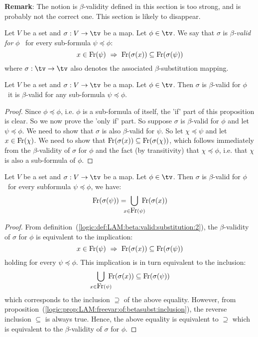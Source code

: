 {\bf Remark}: The notion is $\beta$-validity defined in this section
is too strong, and is probably not the correct one. This section is likely
to disappear.
\begin{defin}\label{logic:def:LAM:beta:valid:substitution:2}
    Let $V$ be a set and $\sigma:V\to\tv$ be a map. Let
    $\phi\in\tv$. We say that $\sigma$ is {\em $\beta$-valid for} $\phi$ 
    \ifand\ for every sub-formula $\psi\preceq\phi$:
    \[
        x\in\free(\psi)\ 
            \Rightarrow\ 
        \free(\sigma(x))\subseteq\free(\sigma(\psi))
    \]
    where $\sigma:\tv\to\tv$ also denotes the associated $\beta$-substitution 
    mapping.
\end{defin}

\begin{prop}\label{logic:prop:LAM:beta:valid:subformula}
    Let $V$ be a set and $\sigma:V\to\tv$ be a map. Let $\phi\in\tv$. 
    Then $\sigma$ is $\beta$-valid for $\phi$ \ifand\ it is $\beta$-valid
    for any sub-formula $\psi\preceq\phi$.
\end{prop}
\begin{proof}
    Since $\phi\preceq\phi$, i.e. $\phi$ is a sub-formula of itself, the
    'if' part of this proposition is clear. So we now prove the 'only
    if' part. So suppose $\sigma$ is $\beta$-valid for $\phi$ and let
    $\psi\preceq\phi$. We need to show that $\sigma$ is also $\beta$-valid for
    $\psi$. So let $\chi\preceq\psi$ and let $x\in\mbox{\rm Fr}(\chi)$. We need
    to show that $\mbox{\rm Fr}(\sigma(x))\subseteq\mbox{\rm Fr}(\sigma(\chi))$, which follows
    immediately from the $\beta$-validity of $\sigma$ for $\phi$ and the fact
    (by transitivity) that $\chi\preceq\phi$, i.e. that $\chi$ is also a
    sub-formula of $\phi$.
\end{proof}

\begin{prop}\label{logic:prop:LAM:beta:valid:free:commute}
    Let $V$ be a set and $\sigma:V\to\tv$ be a map. Let $\phi\in\tv$. 
    Then $\sigma$ is $\beta$-valid for $\phi$ \ifand\ for every 
    subformula $\psi\preceq\phi$, we have:
    \[
        \free(\sigma(\psi))
        =\!\!\!\!
        \bigcup_{x\in\free(\psi)} 
        \!\!\!\!
        \free(\sigma(x))
    \]
\end{prop}
\begin{proof}
    From definition~(\ref{logic:def:LAM:beta:valid:substitution:2}), the 
    $\beta$-validity of $\sigma$ for $\phi$ is equivalent to the implication:
    \[
        x\in\free(\psi)\ \Rightarrow\ 
            \free(\sigma(x))
            \subseteq
            \free(\sigma(\psi))
    \]
    holding for every $\psi\preceq\phi$. This implication is in turn 
    equivalent to the inclusion:
    \[
        \bigcup_{x\in\mbox{\rm Fr}(\psi)} \!\!\!\!\mbox{\rm Fr}(\sigma(x))
        \subseteq
        \mbox{\rm Fr}(\sigma(\psi))
    \]
    which corresponds to the inclusion $\supseteq$ of the above equality. However,
    from proposition~(\ref{logic:prop:LAM:freevar:of:betasubst:inclusion}), 
    the reverse inclusion $\subseteq$ is always true. Hence, the above equality 
    is equivalent to $\supseteq$ which is equivalent to the $\beta$-validity 
    of $\sigma$ for $\phi$.
\end{proof}


